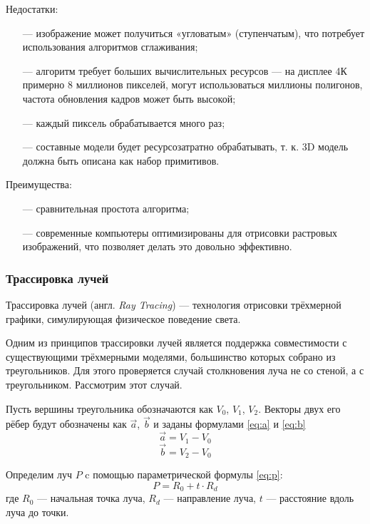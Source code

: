 Недостатки:
\begin{itemize}[leftmargin=1.6\parindent]
	\item[---] изображение может получиться «угловатым» (ступенчатым), что 
	потребует использования алгоритмов сглаживания;
	\item[---] алгоритм требует больших вычислительных ресурсов --- на дисплее 4К 
	примерно 8 миллионов пикселей, могут использоваться миллионы полигонов, 
	частота обновления кадров может быть высокой;
	\item[---] каждый пиксель обрабатывается много раз;
	\item[---] составные модели будет ресурсозатратно обрабатывать, т. к. 3D модель должна быть описана как набор примитивов.
\end{itemize}
\clearpage

Преимущества:
\begin{itemize}[leftmargin=1.6\parindent]
	\item[---] сравнительная простота алгоритма;
	\item[---] современные компьютеры оптимизированы для отрисовки растровых 
	изображений, что позволяет делать это довольно эффективно.
\end{itemize}

\subsubsection{Трассировка лучей}
Трассировка лучей (англ. \textit{Ray Tracing}) \cite{raytracing} --- технология отрисовки 
трёхмерной графики, симулирующая физическое поведение света. 

Одним из принципов трассировки лучей является поддержка 
совместимости с существующими трёхмерными моделями, большинство 
которых собрано из треугольников.
Для этого проверяется случай столкновения 
луча не со стеной, а с треугольником.
Рассмотрим этот случай.

Пусть вершины треугольника обозначаются как $V_0$, $V_1$, $V_2$. 
Векторы  двух его рёбер будут обозначены как $\vec{a}$, $\vec{b}$ и заданы формулами \ref{eq:a} и \ref{eq:b}
\begin{equation}
	\vec{a} = V_1 - V_0
	\label{eq:a}
\end{equation}
\begin{equation}
	\vec{b} = V_2 - V_0
	\label{eq:b}
\end{equation}

Определим луч $P$ c помощью параметрической формулы \ref{eq:p}:
\begin{equation}
	P= R_0 + t \cdot R_d
	\label{eq:p}
\end{equation}
где $R_0$ --- начальная точка луча, $R_d$ --- направление луча, $t$ --- расстояние вдоль луча до точки.

